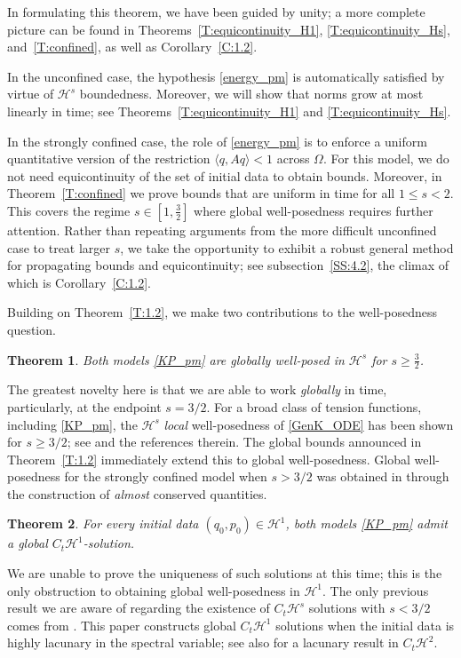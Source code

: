 \documentclass{amsart}
\newtheorem{theorem}{Theorem}[section]
\theoremstyle{definition}
\numberwithin{equation}{section}
\renewcommand{\H}{\mathcal H}
\newcommand{\la}{\langle}
\newcommand{\ra}{\rangle}
\begin{document}
In formulating this theorem, we have been guided by unity; a more complete picture can be found in Theorems~\ref{T:equicontinuity_H1}, \ref{T:equicontinuity_Hs}, and~\ref{T:confined}, as well as Corollary~\ref{C:1.2}.

In the unconfined case, the hypothesis \eqref{energy_pm} is automatically satisfied by virtue of $\H^s$ boundedness. Moreover, we will show that norms grow at most linearly in time; see Theorems~\ref{T:equicontinuity_H1} and \ref{T:equicontinuity_Hs}.

In the strongly confined case, the role of \eqref{energy_pm} is to enforce a uniform quantitative version of the restriction $\la q, Aq\ra<1$ across $\Omega$. For this model, we do not need equicontinuity of the set of initial data to obtain bounds.  Moreover, in Theorem~\ref{T:confined} we prove bounds that are uniform in time for all $1\leq s<2$.  This covers the regime $s\in[1,\tfrac32]$ where global well-posedness requires further attention.  Rather than repeating arguments from the more difficult unconfined case to treat larger $s$, we take the opportunity to exhibit a robust general method for propagating bounds and equicontinuity; see subsection~\ref{SS:4.2}, the climax of which is Corollary~\ref{C:1.2}.

Building on Theorem~\ref{T:1.2}, we make two contributions to the well-posedness question.

\begin{theorem}\label{T:1.3}
Both models \eqref{KP_pm} are globally well-posed in $\H^{s}$ for $s\geq \frac32$.
\end{theorem}

The greatest novelty here is that we are able to work \emph{globally} in time, particularly, at the endpoint $s=3/2$.  For a broad class of tension functions, including \eqref{KP_pm}, the $\H^s$ \emph{local} well-posedness of \eqref{GenK_ODE} has been shown for $s\geq 3/2$; see \cite{AG,AP96I} and the references therein.  The global bounds announced in Theorem~\ref{T:1.2} immediately extend this to global well-posedness.  Global well-posedness for the strongly confined model when $s>3/2$ was obtained in \cite{Panizzi} through the construction of \emph{almost} conserved quantities.

\begin{theorem}\label{T:1.4}
For every initial data $(q_0,p_0)\in \H^1$, both models \eqref{KP_pm} admit a global $C_t \H^1$-solution.
\end{theorem}

We are unable to prove the uniqueness of such solutions at this time; this is the only obstruction to obtaining global well-posedness in $\H^1$.  The only previous result we are aware of regarding the existence of $C_t \H^s$ solutions with $s<3/2$ comes from \cite{GG}.  This paper constructs global $C_t \H^1$ solutions when the initial data is highly lacunary in the spectral variable; see also \cite{Manfrin_Lac} for a lacunary result in $C_t \H^2$.
\end{document}

